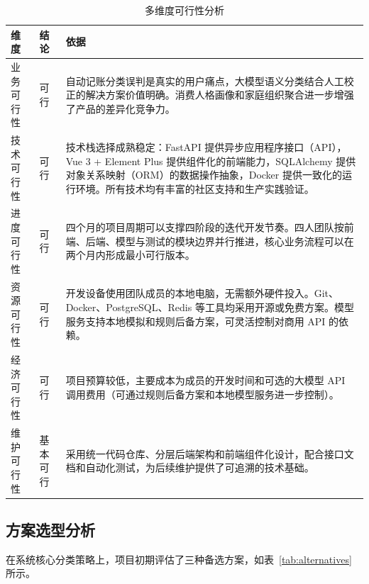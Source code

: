 \begin{table}[H]
\centering
\caption{多维度可行性分析}
\label{tab:feasibility}
\begin{tabular}{p{2.6cm}p{2cm}p{8.6cm}}
\toprule
\textbf{维度} & \textbf{结论} & \textbf{依据} \\
\midrule
业务可行性 & 可行 & 自动记账分类误判是真实的用户痛点，大模型语义分类结合人工校正的解决方案价值明确。消费人格画像和家庭组织聚合进一步增强了产品的差异化竞争力。 \\
\addlinespace
技术可行性 & 可行 & 技术栈选择成熟稳定：FastAPI 提供异步应用程序接口（API），Vue 3 + Element Plus 提供组件化的前端能力，SQLAlchemy 提供对象关系映射（ORM）的数据操作抽象，Docker 提供一致化的运行环境。所有技术均有丰富的社区支持和生产实践验证。 \\
\addlinespace
进度可行性 & 可行 & 四个月的项目周期可以支撑四阶段的迭代开发节奏。四人团队按前端、后端、模型与测试的模块边界并行推进，核心业务流程可以在两个月内形成最小可行版本。 \\
\addlinespace
资源可行性 & 可行 & 开发设备使用团队成员的本地电脑，无需额外硬件投入。Git、Docker、PostgreSQL、Redis 等工具均采用开源或免费方案。模型服务支持本地模拟和规则后备方案，可灵活控制对商用 API 的依赖。 \\
\addlinespace
经济可行性 & 可行 & 项目预算较低，主要成本为成员的开发时间和可选的大模型 API 调用费用（可通过规则后备方案和本地模型服务进一步控制）。 \\
\addlinespace
维护可行性 & 基本可行 & 采用统一代码仓库、分层后端架构和前端组件化设计，配合接口文档和自动化测试，为后续维护提供了可追溯的技术基础。 \\
\bottomrule
\end{tabular}
\end{table}

\subsection{方案选型分析}

在系统核心分类策略上，项目初期评估了三种备选方案，如表~\ref{tab:alternatives} 所示。

